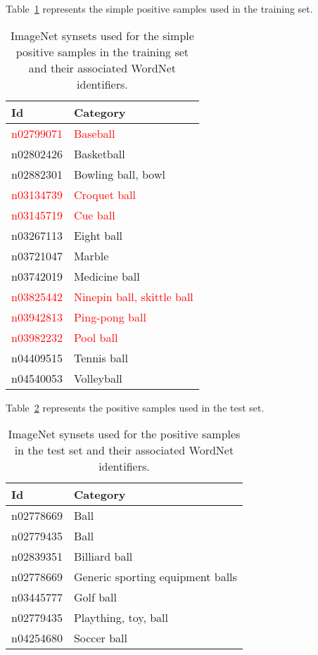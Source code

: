 \documentclass{llncs}
\begin{document}
{		Table~\ref{tab:positive_samples_simple} represents the simple positive samples used in the training set.

		\newcommand{\highlight}[1]{\textcolor{red}{#1}}
		\begin{table}
			\centering
			\caption{ImageNet synsets used for the simple positive samples in the training set and their associated WordNet identifiers.}
			\label{tab:positive_samples_simple}
			\begin{tabularx}{\textwidth}{lX}
				\toprule
				\textbf{Id} & \textbf{Category} \\
				\midrule
					\highlight{n02799071} & \highlight{Baseball} \\
					n02802426 & Basketball \\
					n02882301 & Bowling ball, bowl \\
					\highlight{n03134739} & \highlight{Croquet ball} \\
					\highlight{n03145719} & \highlight{Cue ball} \\
					n03267113 & Eight ball \\
					n03721047 & Marble \\
					n03742019 & Medicine ball \\
					\highlight{n03825442} & \highlight{Ninepin ball, skittle ball} \\
					\highlight{n03942813} & \highlight{Ping-pong ball} \\
					\highlight{n03982232} & \highlight{Pool ball} \\
					n04409515 & Tennis ball \\
					n04540053 & Volleyball \\
				\bottomrule
			\end{tabularx}
		\end{table}

		Table~\ref{tab:test_set} represents the positive samples used in the test set.

		\begin{table}
			\centering
			\caption{ImageNet synsets used for the positive samples in the test set and their associated WordNet identifiers.}
			\label{tab:test_set}
			\begin{tabularx}{\textwidth}{lX}
				\toprule
				\textbf{Id} & \textbf{Category} \\
				\midrule
					n02778669 & Ball \\
					n02779435 & Ball \\
					n02839351 & Billiard ball \\
					n02778669 & Generic sporting equipment balls \\
					n03445777 & Golf ball \\
					n02779435 & Plaything, toy, ball \\
					n04254680 & Soccer ball \\
				\bottomrule
			\end{tabularx}
		\end{table}

}
\end{document}
